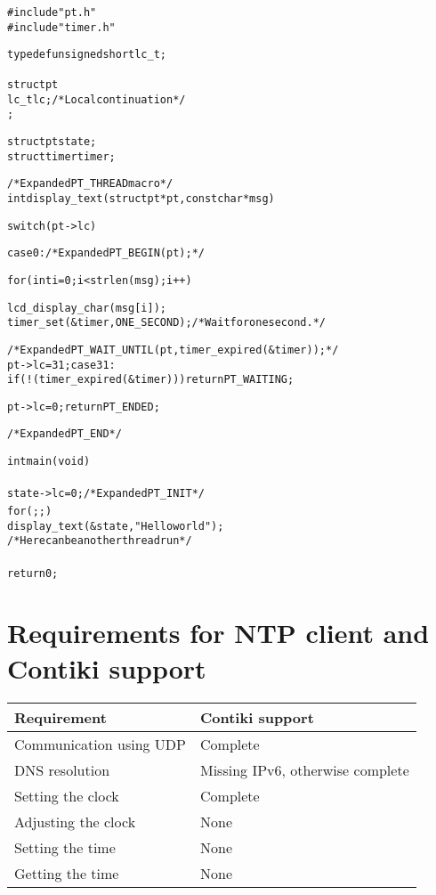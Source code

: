 \begin{alltt}
%\begin{lstlisting}
#include "pt.h"
#include "timer.h"

typedef unsigned short lc_t;

struct pt {
  lc_t lc;         /* Local continuation */
}; 

struct pt state;
struct timer timer;
 
/* Expanded PT_THREAD macro */
int display_text(struct pt *pt, const char *msg)
{
  switch(pt->lc) {  case 0:      /* Expanded PT_BEGIN(pt); */
  
    for (int i = 0; i < strlen(msg); i++) {
      lcd_display_char(msg[i]);
      timer_set(&timer, ONE_SECOND);  /* Wait for one second. */
    
      /* Expanded PT_WAIT_UNTIL(pt, timer_expired(&timer)); */
      pt->lc = 31; case 31:
      if(!(timer_expired(&timer))) { return PT_WAITING; }
    
    }
  
  pt->lc = 0; return PT_ENDED; }   /* Expanded PT_END */
  
}

int main(void)
{
  state->lc = 0;                         /* Expanded PT_INIT */
  for (;;) {
    display_text(&state, "Hello world");
    /* Here can be another thread run */
  }
  return 0;
}

%\end{lstlisting}
\end{alltt}



\chapter{Requirements for NTP client and Contiki support}\label{app:requirements}
\begin{tabular}{|l|l|}
	\hline
	Requirement & Contiki support \\ \hline
	Communication using UDP & Complete \\
	DNS resolution & Missing IPv6, otherwise complete \\
	Setting the clock & Complete \\
	Adjusting the clock & None \\
	Setting the time & None \\
	Getting the time & None \\
	\hline
\end{tabular}

